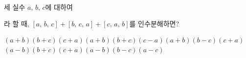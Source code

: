 세 실수 $a$, $b$, $c$에 대하여\par\smallskip{}\par\smallskip\noindent 라 할 때, $[a,\,b,\,c]+[b,\,c,\,a]+[c,\,a,\,b]$를 인수분해하면?
\begin{choicesv}{$(a+b)(b+c)(c+a)$}{$(a+b)(b+c)(c-a)$}{$(a+b)(b-c)(c+a)$}{$(a-b)(b+c)(c+a)$}{$(a-b)(b-c)(a-c)$}\end{choicesv}
